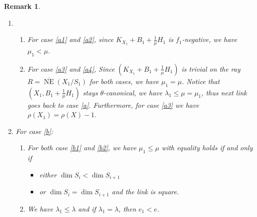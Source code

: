 \documentclass[11pt]{amsart}
\numberwithin{equation}{section}
\newtheorem{rmk}[defn]{Remark}
\begin{document}
\begin{rmk}
  
\begin{enumerate}
  \item 
  \begin{enumerate}
    \item For case \ref{a1} and \ref{a2},  since $ K_{X_1}+B_1+\frac{1}{\mu}H_1 $ is $ f_1 $-negative, we have    $\mu_1<\mu$.
    \item For case \ref{a3} and \ref{a4}, Since $ (K_{X_1}+B_1+\frac{1}{\mu}H_1) $ is trivial on the ray $ R=\overline{\operatorname{NE}}(X_1/S_1) $ for both cases, we have $\mu_1=\mu$.
      Notice that $ (X_1,B_1+\frac{1}{\mu}H_1) $ stays $ \theta $-canonical, we have $\lambda_1\leqslant \mu=\mu_1$, thus next link goes back to case \ref{a}. Furthermore,   for case \ref{a3} we have $\rho(X_1)=\rho(X)-1$.
  \end{enumerate} 
\item For case \ref{b}: 
  \begin{enumerate}
    \item For both case \ref{b1} and \ref{b2}, we have   $\mu_1\leqslant \mu$
    with equality holds if and only if 
    \begin{itemize}
      \item 
        either $\dim S_i<\dim S_{i+1} $
        \item  
        or $\dim S_i=\dim S_{i+1}$ and the link is square.
    \end{itemize}
  \item We have  $\lambda_1\leqslant \lambda$ and if $ \lambda_1=\lambda $, then   $e_1<e$.
  \end{enumerate} 
\end{enumerate}
\end{rmk}
\end{document}
